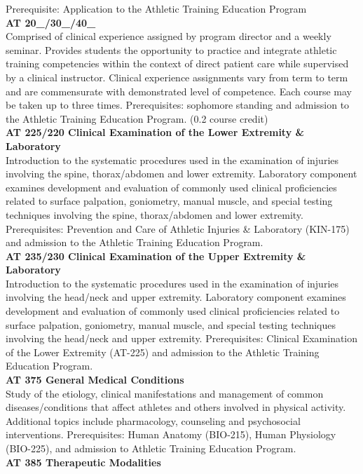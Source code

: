 \documentclass[
  letterpaper,
]{scrbook}
\begin{document}
Prerequisite: Application to the Athletic Training Education Program\\
\textbf{AT 20\_/30\_/40\_}\\
Comprised of clinical experience assigned by program director and a
weekly seminar. Provides students the opportunity to practice and
integrate athletic training competencies within the context of direct
patient care while supervised by a clinical instructor. Clinical
experience assignments vary from term to term and are commensurate with
demonstrated level of competence. Each course may be taken up to three
times. Prerequisites: sophomore standing and admission to the Athletic
Training Education Program. (0.2 course credit)\\
\textbf{AT 225/220 Clinical Examination of the Lower Extremity \&
Laboratory}\\
Introduction to the systematic procedures used in the examination of
injuries involving the spine, thorax/abdomen and lower extremity.
Laboratory component examines development and evaluation of commonly
used clinical proficiencies related to surface palpation, goniometry,
manual muscle, and special testing techniques involving the spine,
thorax/abdomen and lower extremity. Prerequisites: Prevention and Care
of Athletic Injuries \& Laboratory (KIN-175) and admission to the
Athletic Training Education Program.\\
\textbf{AT 235/230 Clinical Examination of the Upper Extremity \&
Laboratory}\\
Introduction to the systematic procedures used in the examination of
injuries involving the head/neck and upper extremity. Laboratory
component examines development and evaluation of commonly used clinical
proficiencies related to surface palpation, goniometry, manual muscle,
and special testing techniques involving the head/neck and upper
extremity. Prerequisites: Clinical Examination of the Lower Extremity
(AT-225) and admission to the Athletic Training Education Program.\\
\textbf{AT 375 General Medical Conditions}\\
Study of the etiology, clinical manifestations and management of common
diseases/conditions that affect athletes and others involved in physical
activity. Additional topics include pharmacology, counseling and
psychosocial interventions. Prerequisites: Human Anatomy (BIO-215),
Human Physiology (BIO-225), and admission to Athletic Training Education
Program.\\
\textbf{AT 385 Therapeutic Modalities}\\
\end{document}
